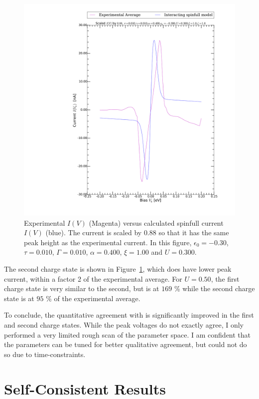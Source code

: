 \begin{figure}[htb]
    \centering
    \includegraphics[width=.95\textwidth, clip=true, trim=11cm 2cm 2cm 0cm]{pdf/fit/fit_spinfull_1.pdf}
    \caption{Experimental $I(V)$ (Magenta) versus calculated spinfull current $I(V)$ (blue). The current is scaled by $0.88$ so that it has the same peak height as the experimental current. In this figure, $\epsilon_0=-0.30$, $\tau=0.010$, $\Gamma=0.010$, $\alpha=0.400$, $\xi=1.00$ and $U=0.300$.
    }
    \label{fig:fitspinfull1}
\end{figure} 

The second charge state is shown in Figure~\ref{fig:fitspinfull1}, which does have lower peak current, within a factor 2 of the experimental average. For $U=0.50$, the first charge state is very similar to the second, but is at $169$ \% while the second charge state is at $95$ \% of the experimental average.

To conclude, the quantitative agreement with \citet{perrinnano} is significantly improved in the first and second charge states. While the peak voltages do not exactly agree, I only performed a very limited rough scan of the parameter space. I am confident that the parameters can be tuned for better qualitative agreement, but could not do so due to time-constraints.

\clearpage\section{Self-Consistent Results}
\label{sec:resultsselfconsistencycalc}

